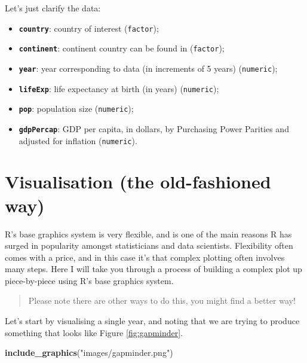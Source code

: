 \documentclass[]{book}
\newenvironment{Shaded}{\begin{snugshade}}{\end{snugshade}}
\newcommand{\KeywordTok}[1]{\textcolor[rgb]{0.13,0.29,0.53}{\textbf{{#1}}}}
\newcommand{\StringTok}[1]{\textcolor[rgb]{0.31,0.60,0.02}{{#1}}}
\newcommand{\NormalTok}[1]{{#1}}
\providecommand{\tightlist}{%
  \setlength{\itemsep}{0pt}\setlength{\parskip}{0pt}}
\theoremstyle{definition}
\theoremstyle{definition}
\theoremstyle{definition}
\theoremstyle{remark}
\begin{document}
Let's just clarify the data:

\begin{itemize}
\tightlist
\item
  \textbf{\texttt{country}}: country of interest (\texttt{factor});
\item
  \textbf{\texttt{continent}}: continent country can be found in
  (\texttt{factor});
\item
  \textbf{\texttt{year}}: year corresponding to data (in increments of 5
  years) (\texttt{numeric});
\item
  \textbf{\texttt{lifeExp}}: life expectancy at birth (in years)
  (\texttt{numeric});
\item
  \textbf{\texttt{pop}}: population size (\texttt{numeric});
\item
  \textbf{\texttt{gdpPercap}}: GDP per capita, in dollars, by Purchasing
  Power Parities and adjusted for inflation (\texttt{numeric}).
\end{itemize}

\chapter{Visualisation (the old-fashioned
way)}\label{visualisation-the-old-fashioned-way}

R's base graphics system is very flexible, and is one of the main
reasons R has surged in popularity amongst statisticians and data
scientists. Flexibility often comes with a price, and in this case it's
that complex plotting often involves many steps. Here I will take you
through a process of building a complex plot up piece-by-piece using R's
base graphics system.

\begin{quote}
Please note there are other ways to do this, you might find a better
way!
\end{quote}

Let's start by visualising a single year, and noting that we are trying
to produce something that looks like Figure \ref{fig:gapminder}.

\begin{Shaded}
\begin{Highlighting}[]
\KeywordTok{include_graphics}\NormalTok{(}\StringTok{"images/gapminder.png"}\NormalTok{)}
\end{Highlighting}
\end{Shaded}
\end{document}
